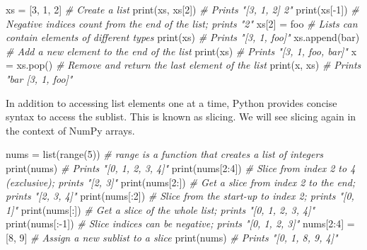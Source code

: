 \documentclass[
]{article}
\newenvironment{Shaded}{}{}
\newcommand{\BuiltInTok}[1]{#1}
\newcommand{\CommentTok}[1]{\textcolor[rgb]{0.38,0.63,0.69}{\textit{#1}}}
\newcommand{\DecValTok}[1]{\textcolor[rgb]{0.25,0.63,0.44}{#1}}
\newcommand{\NormalTok}[1]{#1}
\newcommand{\OperatorTok}[1]{\textcolor[rgb]{0.40,0.40,0.40}{#1}}
\newcommand{\StringTok}[1]{\textcolor[rgb]{0.25,0.44,0.63}{#1}}
\begin{document}
\begin{Shaded}
\begin{Highlighting}[]
\NormalTok{xs }\OperatorTok{=}\NormalTok{ [}\DecValTok{3}\NormalTok{, }\DecValTok{1}\NormalTok{, }\DecValTok{2}\NormalTok{]    }\CommentTok{\# Create a list}
\BuiltInTok{print}\NormalTok{(xs, xs[}\DecValTok{2}\NormalTok{])  }\CommentTok{\# Prints "[3, 1, 2] 2"}
\BuiltInTok{print}\NormalTok{(xs[}\OperatorTok{{-}}\DecValTok{1}\NormalTok{])     }\CommentTok{\# Negative indices count from the end of the list; prints "2"}
\NormalTok{xs[}\DecValTok{2}\NormalTok{] }\OperatorTok{=} \StringTok{\textquotesingle{}foo\textquotesingle{}}     \CommentTok{\# Lists can contain elements of different types}
\BuiltInTok{print}\NormalTok{(xs)         }\CommentTok{\# Prints "[3, 1, \textquotesingle{}foo\textquotesingle{}]"}
\NormalTok{xs.append(}\StringTok{\textquotesingle{}bar\textquotesingle{}}\NormalTok{)  }\CommentTok{\# Add a new element to the end of the list}
\BuiltInTok{print}\NormalTok{(xs)         }\CommentTok{\# Prints "[3, 1, \textquotesingle{}foo\textquotesingle{}, \textquotesingle{}bar\textquotesingle{}]"}
\NormalTok{x }\OperatorTok{=}\NormalTok{ xs.pop()      }\CommentTok{\# Remove and return the last element of the list}
\BuiltInTok{print}\NormalTok{(x, xs)      }\CommentTok{\# Prints "bar [3, 1, \textquotesingle{}foo\textquotesingle{}]"}
\end{Highlighting}
\end{Shaded}

In addition to accessing list elements one at a time, Python provides
concise syntax to access the sublist. This is known as slicing. We will
see slicing again in the context of NumPy arrays.

\begin{Shaded}
\begin{Highlighting}[]
\NormalTok{nums }\OperatorTok{=} \BuiltInTok{list}\NormalTok{(}\BuiltInTok{range}\NormalTok{(}\DecValTok{5}\NormalTok{)) }\CommentTok{\# range is a function that creates a list of integers}
\BuiltInTok{print}\NormalTok{(nums)           }\CommentTok{\# Prints "[0, 1, 2, 3, 4]"}
\BuiltInTok{print}\NormalTok{(nums[}\DecValTok{2}\NormalTok{:}\DecValTok{4}\NormalTok{])      }\CommentTok{\# Slice from index 2 to 4 (exclusive); prints "[2, 3]"}
\BuiltInTok{print}\NormalTok{(nums[}\DecValTok{2}\NormalTok{:])       }\CommentTok{\# Get a slice from index 2 to the end; prints "[2, 3, 4]"}
\BuiltInTok{print}\NormalTok{(nums[:}\DecValTok{2}\NormalTok{])       }\CommentTok{\# Slice from the start{-}up to index 2; prints "[0, 1]"}
\BuiltInTok{print}\NormalTok{(nums[:])        }\CommentTok{\# Get a slice of the whole list; prints "[0, 1, 2, 3, 4]"}
\BuiltInTok{print}\NormalTok{(nums[:}\OperatorTok{{-}}\DecValTok{1}\NormalTok{])      }\CommentTok{\# Slice indices can be negative; prints "[0, 1, 2, 3]"}
\NormalTok{nums[}\DecValTok{2}\NormalTok{:}\DecValTok{4}\NormalTok{] }\OperatorTok{=}\NormalTok{ [}\DecValTok{8}\NormalTok{, }\DecValTok{9}\NormalTok{]    }\CommentTok{\# Assign a new sublist to a slice}
\BuiltInTok{print}\NormalTok{(nums)           }\CommentTok{\# Prints "[0, 1, 8, 9, 4]"}
\end{Highlighting}
\end{Shaded}
\end{document}
